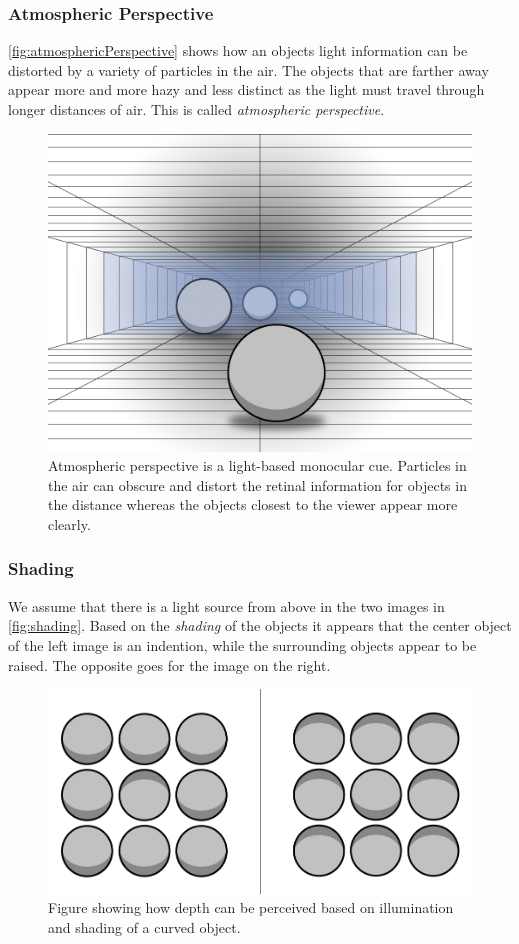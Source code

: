 \subsubsection{Atmospheric Perspective}
\autoref{fig:atmosphericPerspective} shows how an objects light information can be distorted by a variety of particles in the air. The objects that are farther away appear more and more hazy and less distinct as the light must travel through longer distances of air. This is called \textit{atmospheric perspective}\citep[p.~202]{sensationPerception}.
\begin{figure}[H]
	\centering
	\includegraphics[width=0.75\linewidth]{figure/Analysis/atmosphericPerspective2.png}
	\caption{Atmospheric perspective is a light-based monocular cue. Particles in the air can obscure and distort the retinal information for objects in the distance whereas the objects closest to the viewer appear more clearly.}
	\label{fig:atmosphericPerspective}
\end{figure}

\subsubsection{Shading}
We assume that there is a light source from above in the two images in \autoref{fig:shading}. Based on the \textit{shading} of the objects it appears that the center object of the left image is an indention, while the surrounding objects appear to be raised. The opposite goes for the image on the right\citep[p.~202]{sensationPerception}.
\begin{figure}[H]
	\centering
	\includegraphics[width=0.75\linewidth]{figure/Analysis/shading.png}
	\caption{Figure showing how depth can be perceived based on illumination and shading of a curved object.}
	\label{fig:shading}
\end{figure}

